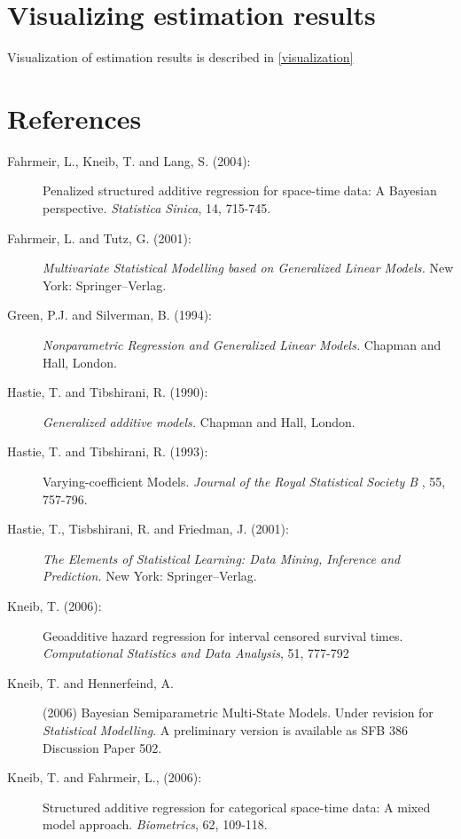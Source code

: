 \section{Visualizing estimation results}

Visualization of estimation results is described in
\autoref{visualization}

\section{References}
\label{remlregreferences}

\begin{description}

\item[Fahrmeir, L., Kneib, T. and Lang, S. (2004):] Penalized
structured additive regression for space-time data: A Bayesian
perspective. {\it Statistica Sinica}, 14, 715-745.

\item[Fahrmeir, L. and Tutz, G. (2001):] {\em Multivariate
Statistical Modelling based on Generalized Linear Models.} New
York: Springer--Verlag.

\item[Green, P.J. and Silverman, B. (1994):] {\em Nonparametric Regression and Generalized Linear Models.} Chapman
and Hall, London.

\item[Hastie, T. and Tibshirani, R. (1990):] {\em Generalized additive models.} Chapman and
Hall, London.

\item[Hastie, T. and Tibshirani, R. (1993):] Varying-coefficient Models.
{\em Journal of the Royal Statistical Society B} , 55, 757-796.

\item[Hastie, T., Tisbshirani, R. and Friedman, J. (2001):] {\em The Elements of Statistical Learning: Data Mining,
Inference and Prediction.} New York: Springer--Verlag.

\item[Kneib, T. (2006):] Geoadditive hazard regression for interval
censored survival times. {\em Computational Statistics and Data
Analysis}, 51, 777-792

\item[Kneib, T. and Hennerfeind, A.] (2006) Bayesian Semiparametric
Multi-State Models. Under revision for {\em Statistical Modelling}.
A preliminary version is available as SFB 386 Discussion Paper 502.

\item[Kneib, T. and Fahrmeir, L., (2006):] Structured additive
regression for categorical space-time data: A mixed model approach.
{\it Biometrics}, 62, 109-118.


\end{description}

